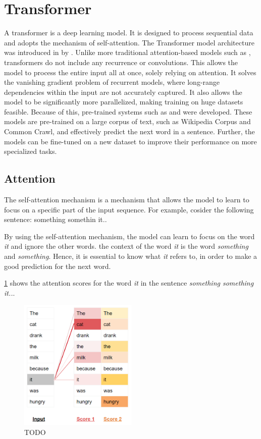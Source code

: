 \section{Transformer}
\label{sec:transformer}
A transformer is a deep learning model. It is designed to process sequential data and adopts the mechanism of self-attention. The Transformer model architecture was introduced in \citeyear{vaswani2017attention} by \textcite{vaswani2017attention}. Unlike more traditional attention-based models such as , transformers do not include any recurrence or convolutions. This allows the model to process the entire input all at once, solely relying on attention. It solves the vanishing gradient problem of recurrent models, where long-range dependencies within the input are not accurately captured. It also allows the model to be significantly more parallelized, making training on huge datasets feasible. Because of this, pre-trained systems such as  and  were developed. These models are pre-trained on a large corpus of text, such as Wikipedia Corpus and Common Crawl, and effectively predict the next word in a sentence. Further, the models can be fine-tuned on a new dataset to improve their performance on more specialized tasks.

\subsection{Attention}

The self-attention mechanism is a mechanism that allows the model to learn to focus on a specific part of the input sequence. For example, cosider the following sentence: 
something somethin it..

By using the self-attention mechanism, the model can learn to focus on the word \textit{it} and ignore the other words. the context of the word \textit{it} is the word \textit{something} and \textit{something}. Hence, it is essential to know what \textit{it} refers to, in order to make a good prediction for the next word.

\cref{fig:attention-scores-example} shows the attention scores for the word \textit{it} in the sentence \textit{something something it..}.

\begin{figure}[htp]
    \centering
    \includegraphics[width=0.5\textwidth]{figures/attention-scores-example.png}
    \caption{TODO}
    \label{fig:attention-scores-example}
\end{figure}


